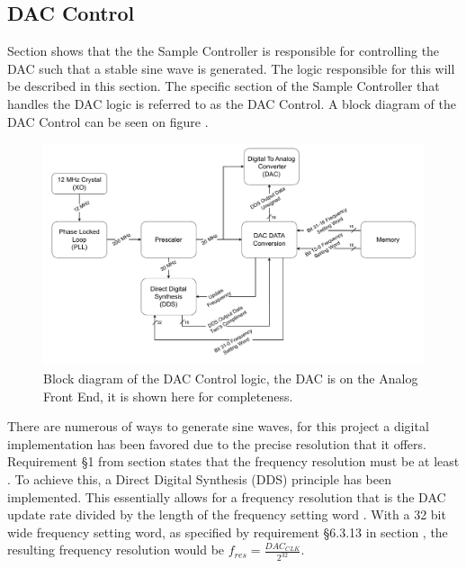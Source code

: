 \subsection{DAC Control} \label{subsec:DAC_CONTROL} 
Section  shows that the the Sample Controller is responsible for controlling the DAC such that a stable sine wave is generated. The logic responsible for this will be described in this section. The specific section of the Sample Controller that handles the DAC logic is referred to as the DAC Control. A block diagram of the DAC Control can be seen on figure .

\begin{figure}[H]
    \centering
    \includegraphics[clip, trim=0 0 0 0, width=1\textwidth]{Sections/7_SystemDesign/Figures/7_2_3_DAC_CONTROL.pdf}
    \caption{Block diagram of the DAC Control logic, the DAC is on the Analog Front End, it is shown here for completeness.}
    \label{fig:7_2_3_DAC_CONTROL}
\end{figure}

There are numerous of ways to generate sine waves, for this project a digital implementation has been favored due to the precise resolution that it offers. Requirement §1 from section  states that the frequency resolution must be at least . To achieve this, a Direct Digital Synthesis (DDS) principle has been implemented. This essentially allows for a frequency resolution that is the DAC update rate divided by the length of the frequency setting word \cite{Fundamentals_DDS}. With a 32 bit wide frequency setting word, as specified by requirement §6.3.13 in section , the resulting frequency resolution would be $f_{res} = \frac{DAC_{CLK}}{2^{32}}$.

